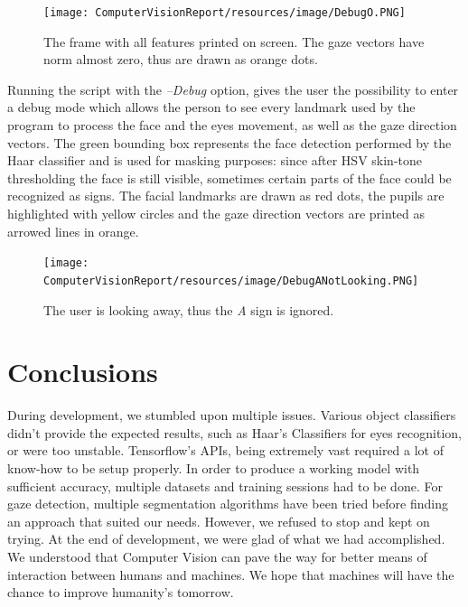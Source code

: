 \documentclass[a4paper, 12pt]{article}
\begin{document}
\begin{figure}[!h]
    \centering
    \texttt{[image: ComputerVisionReport/resources/image/DebugO.PNG]} \caption{The frame with all features printed on screen. The gaze vectors have norm almost zero, thus are drawn as orange dots.}
\end{figure}

Running the script with the \textit{--Debug} option, gives the user the possibility to enter a debug mode which allows the person to see every landmark used by the program to process the face and the eyes movement, as well as the gaze direction vectors.\linebreak
The green bounding box represents the face detection performed by the Haar classifier and is used for masking purposes: since after HSV skin-tone thresholding the face is still visible, sometimes certain parts of the face could be recognized as signs.\linebreak
The facial landmarks are drawn as red dots, the pupils are highlighted with yellow circles and the gaze direction vectors are printed as arrowed lines in orange.

\begin{figure}[!h]
    \centering
    \texttt{[image: ComputerVisionReport/resources/image/DebugANotLooking.PNG]} \caption{The user is looking away, thus the \textit{A} sign is ignored.}
\end{figure}


\section{Conclusions}
\label{Conclusions}
During development, we stumbled upon multiple issues.
Various object classifiers didn't provide the expected results, such as Haar’s Classifiers for eyes recognition, or were too unstable.
Tensorflow's APIs, being extremely vast required a lot of know-how to be setup properly. In order to produce a working model with sufficient accuracy, multiple datasets and training sessions had to be done.
For gaze detection, multiple segmentation algorithms have been tried before finding an approach that suited our needs.\linebreak
However, we refused to stop and kept on trying.
At the end of development, we were glad of what we had accomplished. We understood that Computer Vision can pave the way for better means of interaction between humans and machines.\linebreak
We hope that machines will have the chance to improve humanity's tomorrow.
\end{document}
